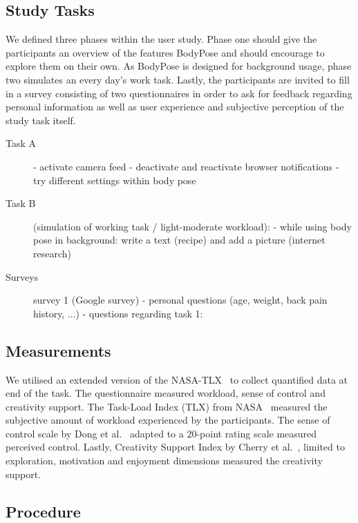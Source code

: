 \subsection{Study Tasks} %
\label{us1-tasks}
We defined three phases within the user study. Phase one should give the participants an overview of the features BodyPose and should encourage to explore them on their own. As BodyPose is designed for background usage, phase two simulates an every day's work task. Lastly, the participants are invited to fill in a survey consisting of two questionnaires in order to ask for feedback regarding personal information as well as user experience and subjective perception of the study task itself.
\begin{description}

\item[Task A]
    - activate camera feed
    - deactivate and reactivate browser notifications
    - try different settings within body pose

\item[Task B] (simulation of working task / light-moderate workload):
    - while using body pose in background: write a text (recipe) and add a picture (internet research)

\item[Surveys]
    survey 1 (Google survey)
        - personal questions (age, weight, back pain history, ...)
        - questions regarding task 1: 

\end{description}

\subsection{Measurements} %
\label{us1-measurements}

We utilised an extended version of the NASA-TLX~\cite{hart2006nasa} to collect quantified data at end of the task. The questionnaire measured workload, sense of control and creativity support. The Task-Load Index (TLX) from NASA~\cite{hart2006nasa} measured the subjective amount of workload experienced by the participants. The sense of control scale by Dong et al.~\cite{dong2015development} adapted to a 20-point rating scale measured perceived control. Lastly, Creativity Support Index by Cherry et al.~\cite{cherry2014quantifying}, limited to exploration, motivation and enjoyment dimensions measured the creativity support.

\subsection{Procedure} %
\label{us1-procedure}
